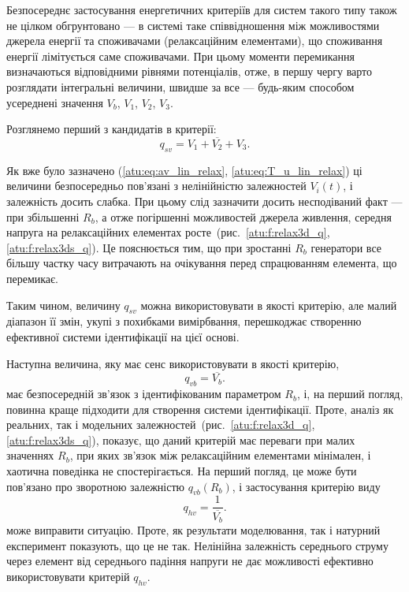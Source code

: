 Безпосереднє застосування енергетичних критеріїв для систем
такого типу також не цілком обгрунтовано --- в системі таке
співвідношення між можливостями джерела енергії та споживачами
(релаксаційним елементами), що споживання енергії лімітується
саме споживачами. При цьому моменти перемикання визначаються
відповідними рівнями потенціалів, отже, в першу чергу варто
розглядати інтегральні величини, швидше за все --- будь-яким
способом усереднені значення
$ V_b $,
$ V_1 $,
$ V_2 $,
$ V_3 $.

Розглянемо перший з кандидатів в критерії:
\begin{equation}
  q_{sv} = \overline{V_1+V_2+V_3} .
  \label{atu:eq:q_sv_relax}
\end{equation}


Як вже було зазначено (\ref{atu:eq:av_lin_relax}, \ref{atu:eq:T_u_lin_relax}) ці величини
безпосередньо пов'язані з нелінійністю залежностей
$ V_i (t) $, і залежність досить слабка. При цьому слід зазначити
досить несподіваний факт --- при збільшенні
$ R_b $, а отже погіршенні можливостей джерела живлення, середня
напруга на релаксаційних елементах росте~(рис.~\ref{atu:f:relax3d_q},
\ref{atu:f:relax3ds_q}). Це пояснюється тим, що при зростанні
$ R_b $ генератори все більшу частку часу витрачають на очікування
перед спрацюванням  елемента, що перемикає.

Таким чином, величину
$q_{sv}$ можна використовувати в якості критерію, але малий
діапазон її змін, укупі з похибками вимірбвання, перешкоджає
створенню ефективної системи ідентифікації на цієї основі.


Наступна величина, яку має сенс використовувати в якості
критерію,
%
\begin{equation}
  q_{vb} = \overline{V_b} .
  \label{atu:eq:q_vb_relax}
\end{equation}
%
має безпосередній зв'язок з ідентифікованим параметром
$ R_b $, і, на перший погляд, повинна краще підходити для створення
системи ідентифікації. Проте, аналіз як реальних, так і модельних
залежностей~(рис.~\ref{atu:f:relax3d_q}, \ref{atu:f:relax3ds_q}), показує, що даний
критерій має переваги при малих значеннях
$ R_b $, при яких зв'язок між релаксаційним елементами мінімален, і
хаотична поведінка не спостерігається. На перший погляд,
це може бути пов'язано про зворотною залежністю
$ q_{vb} (R_b) $, і застосування критерію виду
%
\begin{equation}
  q_{hv} = \frac{1}{\overline{V_b}} .
  \label{atu:eq:q_hb_relax}
\end{equation}
%
може виправити ситуацію. Проте, як результати моделювання,
так і натурний експеримент показують, що це не так. Нелінійна
залежність середнього струму через елемент від середнього
падіння напруги не дає можливості ефективно використовувати критерій
$q_{hv}$.


